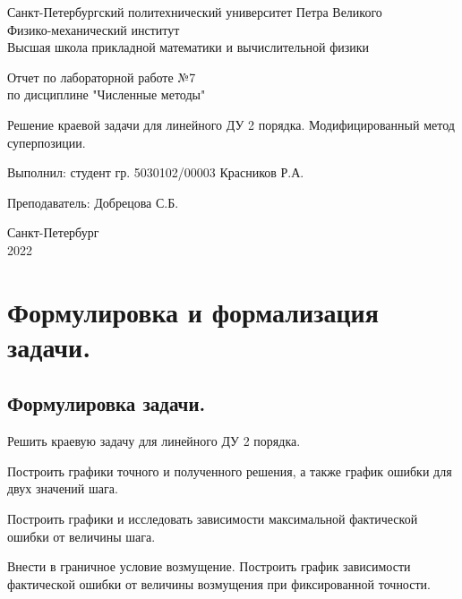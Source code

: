 \documentclass[a4paper, 12pt]{article}
\begin{document}
	\begin{titlepage}
		\begin{center}
			Санкт-Петербургский политехнический университет Петра Великого \\ Физико-механический институт \\ Высшая школа прикладной математики и вычислительной физики
		\end{center}
		\vspace{10em}
		\begin{center}
			\Large Отчет по лабораторной работе №7 \\ по дисциплине "Численные методы"
		\end{center}
		\vspace{1em}
		\begin{center}
			\Huge Решение краевой задачи для линейного ДУ 2 порядка. Модифицированный метод суперпозиции.
		\end{center}
		\vspace{15em}
		{\Large 
			
			Выполнил: студент гр. 5030102/00003 Красников Р.А.
			\vspace{1em}
			
			Преподаватель: Добрецова С.Б.}
		\vspace{\fill}
		\begin{center}
			Санкт-Петербург \\ 2022
		\end{center}
	\end{titlepage}
	\newpage
	
	\section{Формулировка и формализация задачи.}
	
	\subsection{Формулировка задачи.}
	
	Решить краевую задачу для линейного ДУ 2 порядка.
	
	Построить графики точного и полученного решения, а также график ошибки для двух значений шага.
	
	Построить графики и исследовать зависимости максимальной фактической ошибки от величины шага.
	
	Внести в граничное условие возмущение. Построить график зависимости фактической ошибки от величины возмущения при фиксированной точности.  
	
\end{document}
